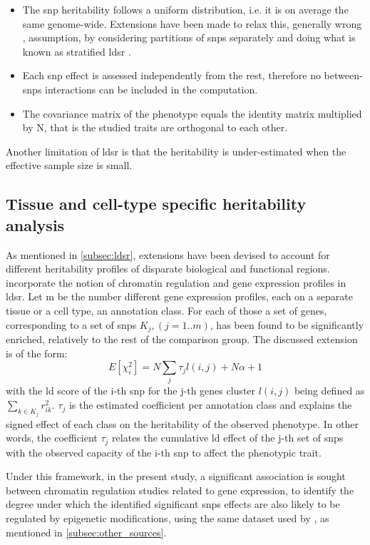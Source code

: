 \begin{itemize}
	\item{The \ac{snp} heritability follows a uniform distribution, i.e. it is on average the same genome-wide. Extensions have been made to relax this, generally wrong \cite{Trynka2013}, assumption, by considering partitions of \acp{snp} separately and doing what is known as stratified \ac{ldsr} \cite{Finucane2015,Finucane2018}.}
	\item{Each \ac{snp} effect is assessed independently from the rest, therefore no between-\acp{snp} interactions can be included in the computation.}
	\item{The covariance matrix of the phenotype equals the identity matrix multiplied by N, that is the studied traits are orthogonal to each other.}
\end{itemize}
Another limitation of \ac{ldsr} is that the heritability is under-estimated when the effective sample size is small\cite{Lee2018}.


\subsection{Tissue and cell-type specific heritability analysis}
As mentioned in \autoref{subsec:ldsr}, extensions have been devised to account for different heritability profiles of disparate biological and functional regions. \citet{Finucane2018} incorporate the notion of chromatin regulation and gene expression profiles in \ac{ldsr}. Let m be the number different gene expression profiles, each on a separate tissue or a cell type, an annotation class. For each of those a set of genes, corresponding to a set of \acp{snp} $K_j,(j=1..m)$, has been found to be significantly enriched, relatively to the rest of the comparison group. The discussed extension is of the form:
$$
E\left[\chi^2_i\right]= N \sum_j{\tau_j l(i,j)} + N \alpha + 1
$$
with the \ac{ld} score of the i-th \ac{snp} for the j-th genes cluster $l(i,j)$ being defined as $\sum_{k \in K_j} r^2_{ik}$. $\tau_j$ is the estimated coefficient per annotation class and explains the signed effect of each class on the heritability of the observed phenotype. In other words, the coefficient $\tau_j$ relates the cumulative \ac{ld} effect of the j-th set of \acp{snp} with the observed capacity of the i-th \ac{snp} to affect the phenotypic trait. 

Under this framework, in the present study, a significant association is sought between chromatin regulation studies related to gene expression, to identify the degree under which the identified significant \acp{snp} effects are also likely to be regulated by epigenetic modifications, using the same dataset used by \citet{Finucane2018}, as mentioned in \autoref{subsec:other_sources}.

